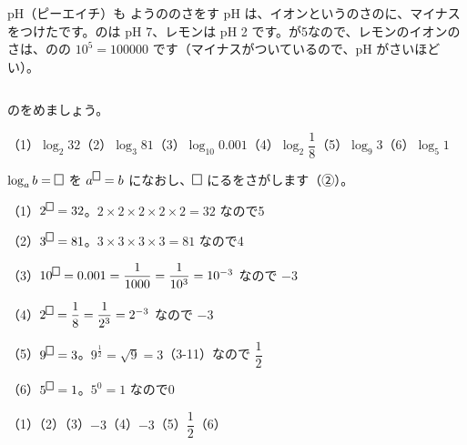 \begin{column}{pH（ピーエイチ）も}
ようののさをす pH は、イオンというのさのに、マイナスをつけたです。のは pH 7、レモンは pH 2 です。が5なので、レモンのイオンのさは、のの $10^5=100000$ です（マイナスがついているので、pH がさいほどい）。
\end{column}

\clearpage
{}

\begin{reidai}
のをめましょう。\par
（1）\nobreak $\log_2 32$\quad（2）\nobreak $\log_3 81$\quad（3）\nobreak $\log_{10}0.001$\quad（4）\nobreak $\log_2\dfrac{1}{8}$\quad（5）\nobreak $\log_9 3$\quad（6）\nobreak $\log_5 1$\par
\kangaekata $\log_ab=\bkthrmbox$ を $a^{\bkthrmbox}=b$ になおし、$\bkthrmbox$ にるをさがします（②）。\par
\shiki（1）\nobreak $2^{\bkthrmbox}=32$。$2\times2\times2\times2\times2=32$ なので5\par
\hspace*{2.6\zw}（2）\nobreak $3^{\bkthrmbox}=81$。$3\times3\times3\times3=81$ なので4\par
\hspace*{2.6\zw}（3）\nobreak $10^{\bkthrmbox}=0.001=\dfrac{1}{1000}=\dfrac{1}{10^3}=10^{-3}$ なので $-3$\par
\hspace*{2.6\zw}（4）\nobreak $2^{\bkthrmbox}=\dfrac{1}{8}=\dfrac{1}{2^3}=2^{-3}$ なので $-3$\par
\hspace*{2.6\zw}（5）\nobreak $9^{\bkthrmbox}=3$。$9^{\frac{1}{2}}=\sqrt{9}=3$（3-11）なので $\dfrac{1}{2}$\par
\hspace*{2.6\zw}（6）\nobreak $5^{\bkthrmbox}=1$。$5^0=1$ なので0\par
\kotae（1）\quad（2）\quad（3）\nobreak $-3$\quad（4）\nobreak $-3$\quad（5）\nobreak $\dfrac{1}{2}$\quad（6）
\end{reidai}

